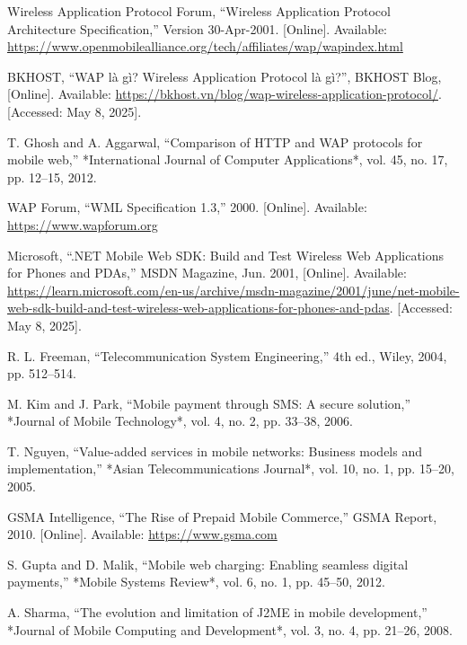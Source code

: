 \documentclass[12pt]{report}
\begin{document}
\begin{thebibliography}{1}
  Wireless Application Protocol Forum, ``Wireless Application Protocol Architecture Specification,'' Version 30-Apr-2001. [Online]. Available: \url{https://www.openmobilealliance.org/tech/affiliates/wap/wapindex.html}

  BKHOST, “WAP là gì? Wireless Application Protocol là gì?”, BKHOST Blog, [Online]. Available: \url{https://bkhost.vn/blog/wap-wireless-application-protocol/}. [Accessed: May 8, 2025].


  T. Ghosh and A. Aggarwal, ``Comparison of HTTP and WAP protocols for mobile web,'' *International Journal of Computer Applications*, vol. 45, no. 17, pp. 12–15, 2012.

  WAP Forum, ``WML Specification 1.3,'' 2000. [Online]. Available: \url{https://www.wapforum.org}

  Microsoft, “.NET Mobile Web SDK: Build and Test Wireless Web Applications for Phones and PDAs,” MSDN Magazine, Jun. 2001, [Online]. Available: \url{https://learn.microsoft.com/en-us/archive/msdn-magazine/2001/june/net-mobile-web-sdk-build-and-test-wireless-web-applications-for-phones-and-pdas}. [Accessed: May 8, 2025].


  R. L. Freeman, ``Telecommunication System Engineering,'' 4th ed., Wiley, 2004, pp. 512–514.

  M. Kim and J. Park, ``Mobile payment through SMS: A secure solution,'' *Journal of Mobile Technology*, vol. 4, no. 2, pp. 33–38, 2006.

  T. Nguyen, ``Value-added services in mobile networks: Business models and implementation,'' *Asian Telecommunications Journal*, vol. 10, no. 1, pp. 15–20, 2005.

  GSMA Intelligence, ``The Rise of Prepaid Mobile Commerce,'' GSMA Report, 2010. [Online]. Available: \url{https://www.gsma.com}

  S. Gupta and D. Malik, ``Mobile web charging: Enabling seamless digital payments,'' *Mobile Systems Review*, vol. 6, no. 1, pp. 45–50, 2012.

  A. Sharma, ``The evolution and limitation of J2ME in mobile development,'' *Journal of Mobile Computing and Development*, vol. 3, no. 4, pp. 21–26, 2008.



\end{thebibliography}
\end{document}
